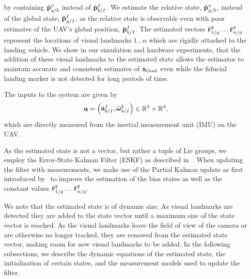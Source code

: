 by containing $\hat{\boldsymbol{\mathrm{p}}}_{g/b}^v$ instead of $\hat{\boldsymbol{\mathrm{p}}}_{b/I}^I$.
We estimate the relative state, $\hat{\boldsymbol{\mathrm{p}}}_{g/b}^v$, instead
of the global state, $\hat{\boldsymbol{\mathrm{p}}}_{g/I}^I$, as the relative state is observable
even with poor estimates of the UAV's global position, $\hat{\boldsymbol{\mathrm{p}}}_{b/I}^I$.
The estimated vectors $\hat{\boldsymbol{\mathrm{r}}}_{1/g}^{g} \dots \hat{\boldsymbol{\mathrm{r}}}_{n/g}^{g}$ represent the
locations of visual landmarks $1 \dots n$ which are rigidly attached to the
landing vehicle. We show in our simulation and hardware experiments, that the
addition of these visual landmarks to the estimated state allows the estimator
to maintain accurate and consistent estimates of $\hat{\boldsymbol{\mathrm{x}}}_{\text{Goal}}$ even
while the fiducial landing marker is not detected for long periods of time. 

The inputs to the system are given by
\begin{equation*}
  \boldsymbol{\mathrm{u}} = \begin{pmatrix} \bar{\boldsymbol{\mathrm{a}}}_{b/I}^I, \bar{\boldsymbol{\mathrm{\omega}}}_{b/I}^b \end{pmatrix} \in
        \mathbb{R}^3 \times \mathbb{R}^3,
\end{equation*}
which are directly measured from the inertial measurement unit (IMU) on the UAV.

As the estimated state is not a vector, but rather a tuple of Lie groups, we
employ the Error-State Kalman Filter (ESKF) as described in~\cite{BLAH}. When
updating the filter with measurements, we make use of the Partial Kalman update
as first introduced by~\cite{brink2017partial} to improve the estimation of the
bias states as well as the constant values $\hat{\boldsymbol{\mathrm{r}}}_{1/g}^{g} \dots
\hat{\boldsymbol{\mathrm{r}}}_{n/g}^{g}$.

We note
that the estimated state is of dynamic size. As visual landmarks are
detected they are added to the state vector until a maximum size of the state
vector is reached. As the visual landmarks leave the field of view of the camera
or are otherwise no longer tracked, they are removed from the estimated state
vector, making room for new visual landmarks to be added. In the following
subsections, we describe the dynamic equations of the estimated state, the
initialization of certain states, and the
measurement models used to update the filter.
